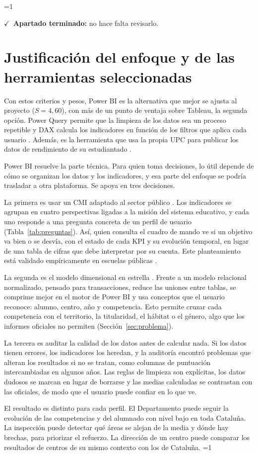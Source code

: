 \documentclass[12pt, a4paper, oneside]{report}
\newcommand{\mostrarterminados}{1}
\newenvironment{revisado}
  {\ifnum\mostrarterminados=1\relax\begin{cajarevisada}\noindent\colorbox{verdeterminado}{\parbox{\dimexpr\linewidth-2\fboxsep\relax}{\small$\checkmark$\ \textbf{Apartado terminado:} no hace falta revisarlo.}}\par\medskip\fi}
  {\ifnum\mostrarterminados=1\relax\end{cajarevisada}\fi}
\begin{document}
\begin{revisado}
\section{Justificación del enfoque y de las herramientas seleccionadas}
\label{sec:justificacion}
Con estos criterios y pesos, Power BI es la alternativa que mejor se ajusta al proyecto ($S = 4{,}60$), con más de un punto de ventaja sobre Tableau, la segunda opción. Power Query permite que la limpieza de los datos sea un proceso repetible y DAX calcula los indicadores en función de los filtros que aplica cada usuario \cite{ferrari2019definitive}. Además, es la herramienta que usa la propia UPC para publicar los datos de rendimiento de su estudiantado \cite{gpaq2021rendiment}.

Power BI resuelve la parte técnica. Para quien toma decisiones, lo útil depende de cómo se organizan los datos y los indicadores, y esa parte del enfoque se podría trasladar a otra plataforma. Se apoya en tres decisiones.

La primera es usar un CMI adaptado al sector público \cite{niven2008balanced}. Los indicadores se agrupan en cuatro perspectivas ligadas a la misión del sistema educativo, y cada uno responde a una pregunta concreta de un perfil de usuario (Tabla~\ref{tab:preguntas}). Así, quien consulta el cuadro de mando ve si un objetivo va bien o se desvía, con el estado de cada KPI y su evolución temporal, en lugar de una tabla de cifras que debe interpretar por su cuenta. Este planteamiento está validado empíricamente en escuelas públicas \cite{rompho2020balanced}.

La segunda es el modelo dimensional en estrella \cite{kimball2013data}. Frente a un modelo relacional normalizado, pensado para transacciones, reduce las uniones entre tablas, se comprime mejor en el motor de Power BI y usa conceptos que el usuario reconoce: alumno, centro, año y competencia. Esto permite cruzar cada competencia con el territorio, la titularidad, el hábitat o el género, algo que los informes oficiales no permiten (Sección~\ref{sec:problema}).

La tercera es auditar la calidad de los datos antes de calcular nada. Si los datos tienen errores, los indicadores los heredan, y la auditoría encontró problemas que alteran los resultados si no se tratan, como columnas de puntuación intercambiadas en algunos años. Las reglas de limpieza son explícitas, los datos dudosos se marcan en lugar de borrarse y las medias calculadas se contrastan con las oficiales, de modo que el usuario puede confiar en lo que ve.

El resultado es distinto para cada perfil. El Departamento puede seguir la evolución de las competencias y del alumnado con nivel bajo en toda Cataluña. La inspección puede detectar qué áreas se alejan de la media y dónde hay brechas, para priorizar el refuerzo. La dirección de un centro puede comparar los resultados de centros de su mismo contexto con los de Cataluña.
\end{revisado}
\end{document}
